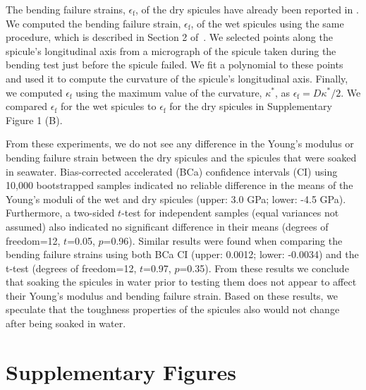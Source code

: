 \documentclass[12pt,onecolumn]{article}
\begin{document}
\begin{bibunit}
The bending failure strains, $\epsilon_\mathrm{f}$, of the dry spicules have already been reported in \cite{monn2017enhanced}. We computed the bending failure strain, $\epsilon_\mathrm{f}$, of the wet spicules using the same procedure, which is described in Section 2 of~\cite{monn2017enhanced}. We selected points along the spicule's longitudinal axis from a micrograph of the spicule taken during the bending test just before the spicule failed. We fit a polynomial to these points and used it to compute the curvature of the spicule's longitudinal axis. Finally, we computed $\epsilon_\mathrm{f}$ using the maximum value of the curvature, $\kappa^*$, as $\epsilon_\mathrm{f}=D \kappa^*/2$. We compared $\epsilon_\mathrm{f}$ for the wet spicules to $\epsilon_\mathrm{f}$ for the dry spicules in Supplementary Figure 1 (B). 

From these experiments, we do not see any difference in the Young's modulus or bending failure strain between the dry spicules and the spicules that were soaked in seawater. Bias-corrected accelerated (BCa) confidence intervals (CI) using 10,000 bootstrapped samples indicated no reliable difference in the means of the Young's moduli of the wet and dry spicules (upper: 3.0 GPa; lower: -4.5 GPa). Furthermore, a two-sided $t$-test for independent samples (equal variances not assumed) also indicated no significant difference in their means (degrees of freedom=12, $t$=0.05, $p$=0.96). Similar results were found when comparing the bending failure strains using both BCa CI (upper: 0.0012; lower: -0.0034) and the t-test (degrees of freedom=12, $t$=0.97, $p$=0.35). From these results we conclude that soaking the spicules in water prior to testing them does not appear to affect their Young's modulus and bending failure strain. Based on these results, we speculate that the toughness properties of the spicules also would not change after being soaked in water.

\section*{Supplementary Figures}


\end{bibunit}
\end{document}
